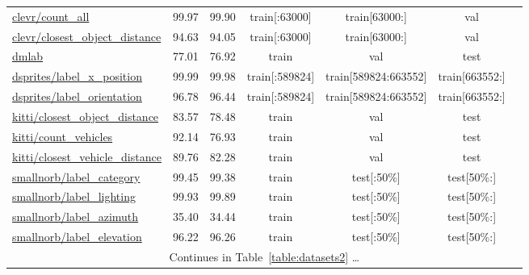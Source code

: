 \documentclass{article} \usepackage{iclr2023_conference,times}
\begin{document}
\begin{table*}[h]
\begin{tabular}{lcccccc}
\href{https://www.tensorflow.org/datasets/catalog/clevr}{clevr/count\_all}
&  99.97  &  99.90
& train[{\tiny:63000}] & train[{\tiny63000:}] & val
& \citep{Johnson2017CLEVRAD}
\\
\href{https://www.tensorflow.org/datasets/catalog/clevr}{clevr/closest\_object\_distance}
&  94.63  &  94.05
& train[{\tiny:63000}] & train[{\tiny63000:}] & val
& \citep{Johnson2017CLEVRAD}
\\
\href{https://www.tensorflow.org/datasets/catalog/dmlab}{dmlab}
&  77.01  &  76.92
& train & val & test
& \citep{Zhai2019TheVT}
\\
\href{https://www.tensorflow.org/datasets/catalog/dsprites}{dsprites/label\_x\_position}
&  99.99  &  99.98
& train[{\tiny:589824}] & train[{\tiny589824:663552}] & train[{\tiny663552:}]
& \citep{Klindt2021TowardsND}
\\
\href{https://www.tensorflow.org/datasets/catalog/dsprites}{dsprites/label\_orientation}
&  96.78  &  96.44
& train[{\tiny:589824}] & train[{\tiny589824:663552}] & train[{\tiny663552:}]
& \citep{Klindt2021TowardsND}
\\
\href{https://www.tensorflow.org/datasets/catalog/kitti}{kitti/closest\_object\_distance}
&  83.57  &  78.48
& train & val & test
& \citep{Geiger2012AreWR}
\\
\href{https://www.tensorflow.org/datasets/catalog/kitti}{kitti/count\_vehicles}
&  92.14  &  76.93
& train & val & test
& \citep{Geiger2012AreWR}
\\
\href{https://www.tensorflow.org/datasets/catalog/kitti}{kitti/closest\_vehicle\_distance}
&  89.76  &  82.28
& train & val & test
& \citep{Geiger2012AreWR}
\\
\href{https://www.tensorflow.org/datasets/catalog/smallnorb}{smallnorb/label\_category}
&  99.45  &  99.38
& train & test[{\tiny:50\%}] & test[{\tiny50\%:}]
& \citep{LeCun2004LearningMF}
\\
\href{https://www.tensorflow.org/datasets/catalog/smallnorb}{smallnorb/label\_lighting}
&  99.93  &  99.89
& train & test[{\tiny:50\%}] & test[{\tiny50\%:}]
& \citep{LeCun2004LearningMF}
\\
\href{https://www.tensorflow.org/datasets/catalog/smallnorb}{smallnorb/label\_azimuth}
&  35.40  &  34.44
& train & test[{\tiny:50\%}] & test[{\tiny50\%:}]
& \citep{LeCun2004LearningMF}
\\
\href{https://www.tensorflow.org/datasets/catalog/smallnorb}{smallnorb/label\_elevation}
&  96.22  &  96.26
& train & test[{\tiny:50\%}] & test[{\tiny50\%:}]
& \citep{LeCun2004LearningMF}
\\

\midrule

\multicolumn{7}{c}{Continues in Table~\ref{table:datasets2} \dots}  \\
\bottomrule
  \end{tabular}
\end{table*}
\end{document}
